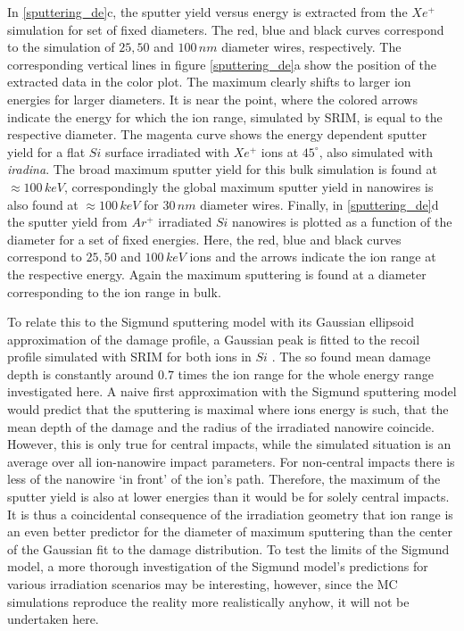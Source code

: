 In \ref{sputtering_de}c, the sputter yield versus energy is extracted from the $Xe^+$ simulation for set of fixed diameters. The red, blue and black curves correspond to the simulation of $25, 50$ and $100\,nm$ diameter wires, respectively. The corresponding vertical lines in figure \ref{sputtering_de}a show the position of the extracted data in the color plot. The maximum clearly shifts to larger ion energies for larger diameters. It is near the point, where the colored arrows indicate the energy for which the ion range, simulated by SRIM, is equal to the respective diameter. The magenta curve shows the energy dependent sputter yield for a flat $Si$ surface irradiated with $Xe^+$ ions at $45^\circ$, also simulated with \emph{iradina}. The broad maximum sputter yield for this bulk simulation is found at $\approx 100 \,keV$, correspondingly the global maximum sputter yield in nanowires is also found at $\approx 100 \,keV$ for $30\,nm$ diameter wires. Finally, in \ref{sputtering_de}d the sputter yield from $Ar^+$ irradiated $Si$ nanowires is plotted as a function of the diameter for a set of fixed energies. Here, the red, blue and black curves correspond to $25, 50$ and $100\,keV$ ions and the arrows indicate the ion range at the respective energy. Again the maximum sputtering is found at a diameter corresponding to the ion range in bulk.

To relate this to the Sigmund sputtering model with its Gaussian ellipsoid approximation of the damage profile, a Gaussian peak is fitted to the recoil profile simulated with SRIM for both ions in $Si$ \cite{bobes_ion_2012}. The so found mean damage depth is constantly around $0.7$ times the ion range for the whole energy range investigated here. A naive first approximation with the Sigmund sputtering model would predict that the sputtering is maximal where ions energy is such, that the mean depth of the damage and the radius of the irradiated nanowire coincide. However, this is only true for central impacts, while the simulated situation is an average over all ion-nanowire impact parameters. For non-central impacts there is less of the nanowire `in front' of the ion's path. Therefore, the maximum of the sputter yield is also at lower energies than it would be for solely central impacts. It is thus a coincidental consequence of the irradiation geometry that ion range is an even better predictor for the diameter of maximum sputtering than the center of the Gaussian fit to the damage distribution. To test the limits of the Sigmund model, a more thorough investigation of the Sigmund model's predictions for various irradiation scenarios may be interesting, however, since the MC simulations reproduce the reality more realistically anyhow, it will not be undertaken here.



